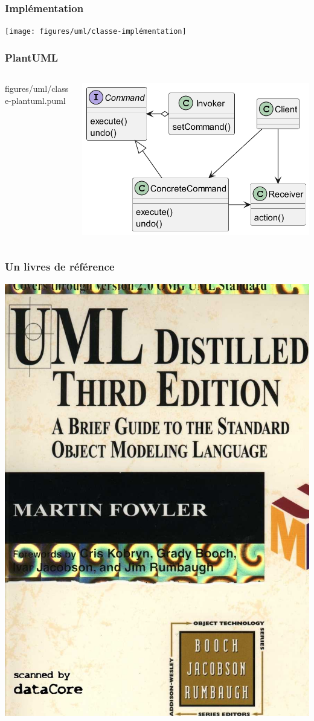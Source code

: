 \begin{frame}
    \frametitle{Implémentation}
    \centering
    \texttt{[image: figures/uml/classe-implémentation]}
\end{frame}

\begin{frame}
    \frametitle{PlantUML}
    \begin{columns}
        \begin{column}{0.4\textwidth}
            
            {figures/uml/classe-plantuml.puml}
        \end{column}
        \begin{column}{0.6\textwidth}
            \centering
            \includegraphics[width=0.8\linewidth]{figures/uml/classe-plantuml}
        \end{column}
    \end{columns}
\end{frame}

\begin{frame}
    \frametitle{Un livres de référence}
    \centering
    \includegraphics[height=0.5\linewidth]{figures/uml/uml-book}
\end{frame}
